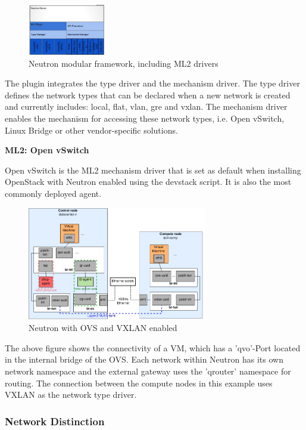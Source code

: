 \begin{figure}[H]
\centering
\includegraphics[width=0.3\textwidth]{images/fundamentals/neutron_ml2.png}
\caption{Neutron modular framework, including ML2 drivers}
\end{figure}

The plugin integrates the type driver and the mechanism driver. The type driver defines the network types that can be declared when a new network is created and currently includes: local, flat, vlan, gre and vxlan. The mechanism driver enables the mechanism for accessing these network types, i.e. Open vSwitch, Linux Bridge or other vendor-specific solutions. 



\textbf{ML2: Open vSwitch}

Open vSwitch is the ML2 mechanism driver that is set as default when installing OpenStack with Neutron enabled using the devstack script. It is also the most commonly deployed agent.

\begin{figure}[H]
\centering
\includegraphics[width=0.7\textwidth]{images/fundamentals/neutron_ovs_bridges.png}
\caption{Neutron with OVS and VXLAN enabled}
\end{figure}

The above figure shows the connectivity of a VM, which has a 'qvo'-Port located in the internal bridge of the OVS. Each network within Neutron has its own network namespace and the external gateway uses the 'qrouter' namespace for routing. The connection between the compute nodes in this example uses VXLAN as the network type driver.


\subsubsection{Network Distinction}

